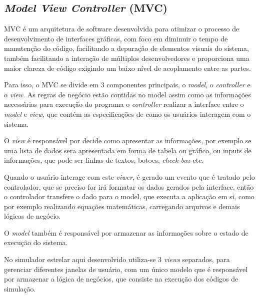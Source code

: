 \subsection{\textit{Model View Controller} (MVC)}

MVC é um arquitetura de software desenvolvida para otimizar o processo de desenvolvimento de interfaces gráficas, 
com foco em diminuir o tempo de manutenção do código, 
facilitando a depuração de elementos visuais do sistema, 
também facilitando a interação de múltiplos desenvolvedores e proporciona uma maior clareza de código exigindo um baixo nível de acoplamento entre as partes. 

Para isso, o MVC se divide em 3 componentes principais, o \textit{model}, o \textit{controller} e o \textit{view}. 
As regras de negócio estão contidas no model assim como as informações necessárias para execução do programa o \textit{controller} realizar a interface entre o \textit{model} e \textit{view}, 
que contém as especificações de como os usuários interagem com o sistema.

O \textit{view} é responsável por decide como apresentar as informações, 
por exemplo se uma lista de dados sera apresentada em forma de tabela ou gráfico,
ou inputs de informações, que pode ser linhas de textos, botoes, \textit{check box} etc.

Quando o usuário interage com este \textit{viwer}, 
é gerado um evento que é tratado pelo controlador,
que se preciso for irá formatar os dados gerados pela interface, 
então o controlador transfere o dado para o model, 
que executa a aplicação em si, 
como por exemplo realizando equações matemáticas, 
carregando arquivos e demais lógicas de negócio.

O \textit{model} também é responsável por armazenar as informações sobre o estado de execução do sistema.

No simulador estrelar aqui desenvolvido utiliza-se 3 \textit{views} separados, para gerenciar diferentes janelas de usuário, com um único modelo que é responsável por armazenar a lógica de negócios, que consiste na execução dos códigos de simulação.

